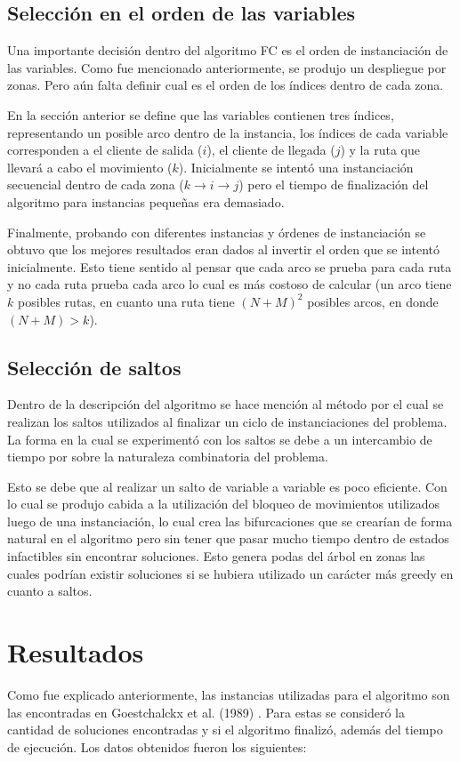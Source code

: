 \documentclass[letter, 10pt]{article}
\begin{document}
\subsection{Selección en el orden de las variables}
Una importante decisión dentro del algoritmo FC es el orden de instanciación de las variables. Como fue mencionado anteriormente, se produjo un despliegue por zonas. Pero aún falta definir cual es el orden de los índices dentro de cada zona.

En la sección anterior se define que las variables contienen tres índices, representando un posible arco dentro de la instancia, los índices de cada variable corresponden a el cliente de salida ($i$), el cliente de llegada ($j$) y la ruta que llevará a cabo el movimiento ($k$). Inicialmente se intentó una instanciación secuencial dentro de cada zona ($k \rightarrow i \rightarrow j$) pero el tiempo de finalización del algoritmo para instancias pequeñas era demasiado.

Finalmente, probando con diferentes instancias y órdenes de instanciación se obtuvo que los mejores resultados eran dados al invertir el orden que se intentó inicialmente. Esto tiene sentido al pensar que cada arco se prueba para cada ruta y no cada ruta prueba cada arco lo cual es más costoso de calcular (un arco tiene $k$ posibles rutas, en cuanto una ruta tiene $(N+M)^2$ posibles arcos, en donde $(N+M) > k$).

\subsection{Selección de saltos}
Dentro de la descripción del algoritmo se hace mención al método por el cual se realizan los saltos utilizados al finalizar un ciclo de instanciaciones del problema. La forma en la cual se experimentó con los saltos se debe a un intercambio de tiempo por sobre la naturaleza combinatoria del problema. 

Esto se debe que al realizar un salto de variable a variable es poco eficiente. Con lo cual se produjo cabida a la utilización del bloqueo de movimientos utilizados luego de una instanciación, lo cual crea las bifurcaciones que se crearían de forma natural en el algoritmo pero sin tener que pasar mucho tiempo dentro de estados infactibles sin encontrar soluciones. Esto genera podas del árbol en zonas las cuales podrían existir soluciones si se hubiera utilizado un carácter más greedy en cuanto a saltos.


\section{Resultados}
Como fue explicado anteriormente, las instancias utilizadas para el algoritmo son las encontradas en Goestchalckx et al. (1989) \cite{goetschalckx1989vehicle}. Para estas se consideró la cantidad de soluciones encontradas y si el algoritmo finalizó, además del tiempo de ejecución. Los datos obtenidos fueron los siguientes:
\end{document}
